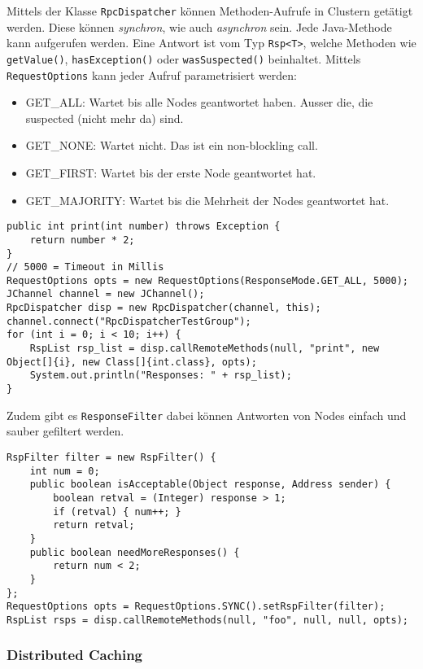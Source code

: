 Mittels der Klasse \verb|RpcDispatcher| können Methoden-Aufrufe in Clustern getätigt werden. Diese können \emph{synchron}, wie auch \emph{asynchron} sein. Jede Java-Methode kann aufgerufen werden. Eine Antwort ist vom Typ \verb|Rsp<T>|, welche Methoden wie \verb|getValue()|, \verb|hasException()| oder \verb|wasSuspected()| beinhaltet. Mittels \verb|RequestOptions| kann jeder Aufruf parametrisiert werden:
	
\begin{itemize}
	\item GET\_ALL: Wartet bis alle Nodes geantwortet haben. Ausser die, die suspected (nicht mehr da) sind.
	\item GET\_NONE: Wartet nicht. Das ist ein non-blockling call.
	\item GET\_FIRST: Wartet bis der erste Node geantwortet hat.
	\item GET\_MAJORITY: Wartet bis die Mehrheit der Nodes geantwortet hat.
\end{itemize}
	
\begin{lstlisting}[caption=Methoden-Aufruf im Cluster]
public int print(int number) throws Exception {
	return number * 2;
} 
// 5000 = Timeout in Millis
RequestOptions opts = new RequestOptions(ResponseMode.GET_ALL, 5000);
JChannel channel = new JChannel();
RpcDispatcher disp = new RpcDispatcher(channel, this);
channel.connect("RpcDispatcherTestGroup");
for (int i = 0; i < 10; i++) {
	RspList rsp_list = disp.callRemoteMethods(null, "print", new Object[]{i}, new Class[]{int.class}, opts);
	System.out.println("Responses: " + rsp_list);
}
\end{lstlisting}
\noindent
Zudem gibt es \verb|ResponseFilter| dabei können Antworten von Nodes einfach und sauber gefiltert werden.
	
\begin{lstlisting}[caption=Antwort filtern]
RspFilter filter = new RspFilter() {
	int num = 0;
	public boolean isAcceptable(Object response, Address sender) {
		boolean retval = (Integer) response > 1;
		if (retval) { num++; }
		return retval;
	}
	public boolean needMoreResponses() {
		return num < 2;
	}
};
RequestOptions opts = RequestOptions.SYNC().setRspFilter(filter);
RspList rsps = disp.callRemoteMethods(null, "foo", null, null, opts);
\end{lstlisting}
	
\subsubsection{Distributed Caching}

